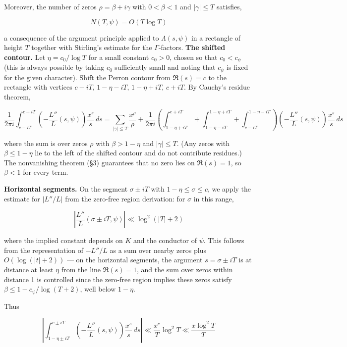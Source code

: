 \documentclass[12pt,a4paper]{article}
\newcommand{\pilcrow}{\S}
\begin{document}
Moreover, the number of zeros $\rho = \beta + i\gamma$ with $0 < \beta < 1$ and $|\gamma| \leq T$ satisfies,

\[
N(T, \psi) = O(T \log T)
\]

a consequence of the argument principle applied to $\Lambda(s, \psi)$ in a rectangle of height $T$ together with Stirling's estimate for the $\Gamma$-factors.
\textbf{The shifted contour.} Let $\eta = c_0/\log T$ for a small constant $c_0 > 0$, chosen so that $c_0 < c_{\psi}$ (this is always possible by taking $c_0$ sufficiently small and noting that $c_{\psi}$ is fixed for the given character). Shift the Perron contour from $\Re(s) = c$ to the rectangle with vertices $c-iT$, $1-\eta-iT$, $1-\eta+iT$, $c+iT$. By Cauchy's residue theorem,

\[
\frac{1}{2\pi i} \int_{c-iT}^{c+iT} \left(-\frac{L''}{L}(s, \psi)\right) \frac{x^s}{s} \, ds = \sum_{|\gamma| \leq T} \frac{x^\rho}{\rho} + \frac{1}{2\pi i} \left( \int_{1-\eta+iT}^{c+iT} \!\!\! + \int_{1-\eta-iT}^{1-\eta+iT} \!\!\! + \int_{c-iT}^{1-\eta-iT} \right) \left(-\frac{L''}{L}(s, \psi)\right) \frac{x^s}{s} \, ds
\]

where the sum is over zeros $\rho$ with $\beta > 1-\eta$ and $|\gamma| \leq T$. (Any zeros with $\beta \leq 1-\eta$ lie to the left of the shifted contour and do not contribute residues.) The nonvanishing theorem (\pilcrow{}3) guarantees that no zero lies on $\Re(s)=1$, so $\beta < 1$ for every term.

\textbf{Horizontal segments.} On the segment $\sigma \pm iT$ with $1-\eta \leq \sigma \leq c$, we apply the estimate for $|L''/L|$ from the zero-free region derivation: for $\sigma$ in this range,

\[
\left|\frac{L''}{L}(\sigma \pm iT, \psi)\right| \ll \log^2(|T|+2)
\]

where the implied constant depends on $K$ and the conductor of $\psi$. This follows from the representation of $-L''/L$ as a sum over nearby zeros plus $O(\log(|t|+2))$ --- on the horizontal segments, the argument $s = \sigma \pm iT$ is at distance at least $\eta$ from the line $\Re(s)=1$, and the sum over zeros within distance 1 is controlled since the zero-free region implies these zeros satisfy $\beta \leq 1 - c_{\psi}/\log(T+2)$, well below $1-\eta$.

Thus

\[
\left| \int_{1-\eta \pm iT}^{c \pm iT} \left(-\frac{L''}{L}(s, \psi)\right) \frac{x^s}{s} \, ds \right| \ll \frac{x^c}{T} \log^2 T \ll \frac{x \log^2 T}{T}
\]
\end{document}
